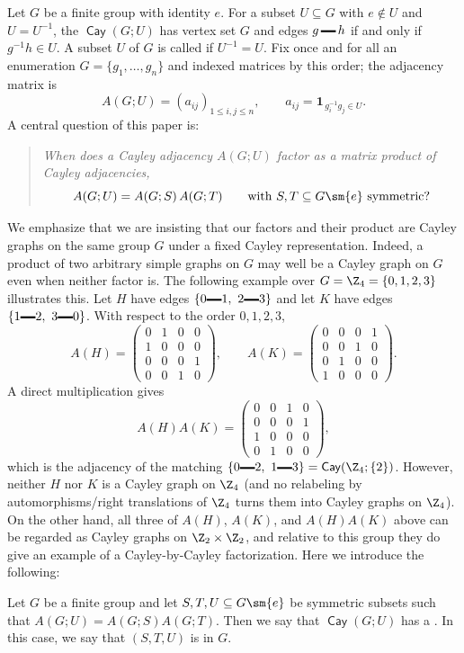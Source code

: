 \documentclass{file}
\newcommand{\cay}{\mathop{\mathsf{Cay}}}
\newcommand{\edge}{\mathord{\,\vrule width 12pt height 3pt depth -1.5pt}\,}
\begin{document}
Let $G$ be a finite group with identity $e$. For a subset $U\subseteq G$ with $e\notin U$ and $U=U^{-1}$, the  $\cay(G;U)$ has vertex set $G$ and edges $g\edge h$ if and only if $g^{-1}h\in U$. 
A subset $ U $ of $ G $ is called  if $ U^{-1} = U $.
Fix once and for all an enumeration $G=\{g_1,\dots,g_n\}$ and indexed matrices by this order; the adjacency matrix is
\[
A(G;U)=(a_{ij})_{1\le i,j\le n},\qquad a_{ij}=\mathbf 1_{\,g_i^{-1}g_j\in U}.
\]
A central question of this paper is:

\begin{quote}
\emph{When does a Cayley adjacency $A(G;U)$ factor as a matrix product of Cayley adjacencies,}
\[
A(G;U)=A(G;S)\,A(G;T)\qquad\text{with }S,T\subseteq G\sm \{e\}\text{ symmetric?}
\]
\end{quote}

We emphasize that we are insisting that our factors and their product are Cayley graphs on the same group $G$ under a fixed Cayley representation.  Indeed, a product of two arbitrary simple graphs on $G$ may well be a Cayley graph on $G$ even when neither factor is.  The following example over $G=\Z_4=\{0,1,2,3\}$ illustrates this.
Let $H$ have edges $\{0\!\edge\!1,\ 2\!\edge\!3\}$ and let $K$ have edges $\{1\!\edge\!2,\ 3\!\edge\!0\}$.  With respect to the order $0,1,2,3$,
\[
A(H)=\begin{pmatrix}
0&1&0&0\\
1&0&0&0\\
0&0&0&1\\
0&0&1&0
\end{pmatrix},\qquad
A(K)=\begin{pmatrix}
0&0&0&1\\
0&0&1&0\\
0&1&0&0\\
1&0&0&0
\end{pmatrix}.
\]
A direct multiplication gives
\[
A(H)A(K)=\begin{pmatrix}
0&0&1&0\\
0&0&0&1\\
1&0&0&0\\
0&1&0&0
\end{pmatrix},
\]
which is the adjacency of the matching $\{0\!\edge\!2,\ 1\!\edge\!3\}=\cay(\Z_4;\{2\})$.  However, neither $H$ nor $K$ is a Cayley graph on $\Z_4$ (and no relabeling by automorphisms/right translations of $\Z_4$ turns them into Cayley graphs on $\Z_4$).  On the other hand, all three of $A(H)$, $A(K)$, and $A(H)A(K)$ above can be regarded as Cayley graphs on $\Z_2 \times \Z_2$, and relative to this group they do give an example of a Cayley-by-Cayley factorization. 
Here we introduce the following:
\begin{defn}
Let $G $ be a finite group and let $S,T,U\subseteq G\sm \{e\}$ be symmetric subsets such that $A(G;U)=A(G;S)A(G;T)$. 
Then we say that $\cay(G;U)$ has a .
In this case, we say that $(S,T,U)$ is  in $G$.
\end{defn}
\end{document}
